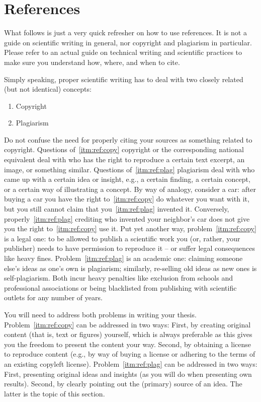 \clearpage
\section{References}

What follows is just a very quick refresher on how to use references.
It is not a guide on scientific writing in general, nor copyright and plagiarism in particular.
Please refer to an actual guide on technical writing and scientific practices to make sure you understand how, where, and when to cite.

Simply speaking, proper scientific writing has to deal with two closely related (but not identical) concepts:
\begin{enumerate}[label=\alph*),ref=(\alph*)]
\item\label{itm:ref:copy}
Copyright
\item
Plagiarism\label{itm:ref:plag}
\end{enumerate}
Do not confuse the need for properly citing your sources as something related to copyright.
Questions of~\ref{itm:ref:copy} copyright or the corresponding national equivalent deal with who has the right to reproduce a certain text excerpt, an image, or something similar.
Questions of~\ref{itm:ref:plag} plagiarism deal with who came up with a certain idea or insight, e.g., a certain finding, a certain concept, or a certain way of illustrating a concept.
By way of analogy, consider a car: after buying a car you have the right to~\ref{itm:ref:copy} do whatever you want with it, but you still cannot claim that you~\ref{itm:ref:plag} invented it.
Conversely, properly~\ref{itm:ref:plag} crediting who invented your neighbor's car does not give you the right to~\ref{itm:ref:copy} use it.
Put yet another way, problem~\ref{itm:ref:copy} is a legal one: to be allowed to publish a scientific work you (or, rather, your publisher) needs to have permission to reproduce it -- or suffer legal consequences like heavy fines.
Problem~\ref{itm:ref:plag} is an academic one: claiming someone else's ideas as one's own is plagiarism; similarly, re-selling old ideas as new ones is self-plagiarism.
Both incur heavy penalties like exclusion from schools and professional associations or being blacklisted from publishing with scientific outlets for any number of years.

You will need to address both problems in writing your thesis.
Problem~\ref{itm:ref:copy} can be addressed in two ways:
First, by creating original content (that is, text or figures) yourself, which is always preferable as this gives you the freedom to present the content your way.
Second, by obtaining a license to reproduce content (e.g., by way of buying a license or adhering to the terms of an existing copyleft license).
Problem~\ref{itm:ref:plag} can be addressed in two ways:
First, presenting original ideas and insights (as you will do when presenting own results).
Second, by clearly pointing out the (primary) source of an idea.
The latter is the topic of this section.

